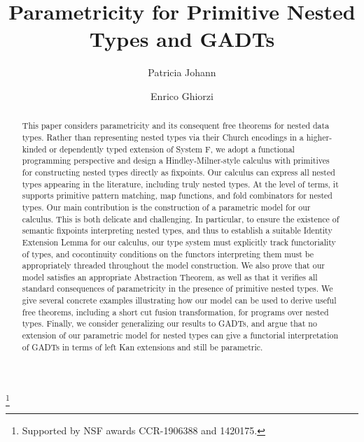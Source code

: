 \documentclass{lmcs}
\theoremstyle{plain}\newtheorem{satz}[thm]{Satz}
\begin{document}
\title[Parametricity for Primitive Nested Types and
  GADTs]{Parametricity for Primitive Nested Types and GADTs}

\author[P.~Johann]{Patricia Johann}	
\address{Appalachian State University}	
\thanks{Supported by NSF awards CCR-1906388 and 1420175.}

\author[E.~Ghiorzi]{Enrico Ghiorzi}	
\address{Appalachian State University}	


\begin{abstract}
This paper considers parametricity and its consequent free theorems
for nested data types. Rather than representing nested types via their
Church encodings in a higher-kinded or dependently typed extension of
System F, we adopt a functional programming perspective and design a
Hindley-Milner-style calculus with primitives for constructing nested
types directly as fixpoints. Our calculus can express all nested types
appearing in the literature, including truly nested types. At the
level of terms, it supports primitive pattern matching, map functions,
and fold combinators for nested types. Our main contribution is the
construction of a parametric model for our calculus. This is both
delicate and challenging. In particular, to ensure the existence of
semantic fixpoints interpreting nested types, and thus to establish a
suitable Identity Extension Lemma for our calculus, our type system
must explicitly track functoriality of types, and cocontinuity
conditions on the functors interpreting them must be appropriately
threaded throughout the model construction. We also prove that our
model satisfies an appropriate Abstraction Theorem, as well as that it
verifies all standard consequences of parametricity in the presence of
primitive nested types. We give several concrete examples illustrating
how our model can be used to derive useful free theorems, including a
short cut fusion transformation, for programs over nested
types. Finally, we consider generalizing our results to GADTs, and
argue that no extension of our parametric model for nested types can
give a functorial interpretation of GADTs in terms of left Kan
extensions and still be parametric.
\end{abstract}

\maketitle
\end{document}

